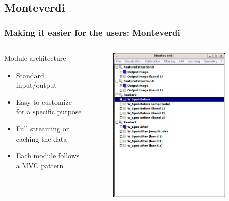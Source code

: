 \documentclass[compress]{beamer}
\begin{document}
\subsection{Monteverdi}
\begin{frame}
\frametitle{Making it easier for the users: Monteverdi}
\begin{columns}
\begin{column}{0.5\textwidth}
\begin{block}{Module architecture}
\scriptsize
\begin{itemize}
\item Standard input/output
\item Easy to customize for a specific purpose
\item Full streaming or caching the data
\item Each module follows a MVC pattern
\end{itemize}
\end{block}
\end{column}
\begin{column}{0.5\textwidth}
\begin{figure}[]
  \includegraphics[width=0.9\textwidth]{monteverdi1.jpg}
\end{figure}
\end{column}
\end{columns}
\end{frame}
\end{document}
